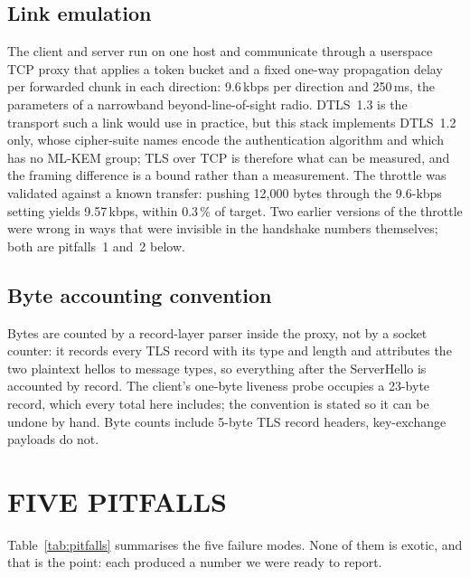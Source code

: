 \documentclass[]{spie}  %
\begin{document}
\subsection{Link emulation}

The client and server run on one host and communicate through a
userspace TCP proxy that applies a token bucket and a fixed one-way
propagation delay per forwarded chunk in each direction: 9.6\,kbps per
direction and 250\,ms, the parameters of a narrowband
beyond-line-of-sight radio. DTLS~1.3 is the transport such a link would
use in practice, but this stack implements DTLS~1.2 only\cite{rfc9147,rfc6347},
whose cipher-suite names encode the authentication algorithm and which
has no ML-KEM group; TLS over TCP is therefore what can be measured,
and the framing difference is a bound rather than a measurement. The throttle was validated against a known
transfer: pushing 12{,}000 bytes through the 9.6-kbps setting yields
9.57\,kbps, within 0.3\,\% of target. Two earlier versions of the
throttle were wrong in ways that were invisible in the handshake numbers
themselves; both are pitfalls~1 and~2 below.

\subsection{Byte accounting convention}

Bytes are counted by a record-layer parser inside the proxy, not by a
socket counter: it records every TLS record with its type and length and
attributes the two plaintext hellos to message types, so everything after
the ServerHello is accounted by record. The client's one-byte liveness
probe occupies a 23-byte record, which every total here includes; the
convention is stated so it can be undone by hand. Byte counts include
5-byte TLS record headers, key-exchange payloads do not.

\section{FIVE PITFALLS}
\label{sec:pitfalls}

Table~\ref{tab:pitfalls} summarises the five failure modes. None of them
is exotic, and that is the point: each produced a number we were ready
to report.
\end{document}
